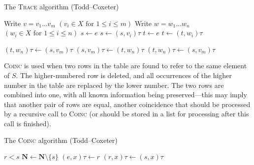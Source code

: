 \begin{algorithm}
\caption{The \textsc{Trace} algorithm (Todd--Coxeter)}
\label{alg:trace}
\begin{algorithmic}[1]
\State Write $v = v_1 \ldots v_m$ \Comment $(v_i \in X \text{~for~} 1 \leq i \leq m)$
\State Write $w = w_1 \ldots w_n$ \Comment $(w_i \in X \text{~for~} 1 \leq i \leq n)$
\State $s \gets e$
    \State {}
  \EndIf
  \State $s \gets (s, v_i)\tau$
\EndFor
\State $t \gets e$
    \State {}
  \EndIf
  \State $t \gets (t, w_i)\tau$
\EndFor

  \State {}
  \State $(t, w_n)\tau \gets (s, v_m)\tau$
  \State $(s, v_m)\tau \gets (t, w_n)\tau$
  \State $(t, w_n)\tau \gets (s, v_m)\tau$
  \State {}
\EndIf

\EndProcedure
\end{algorithmic}
\end{algorithm}

\textsc{Coinc} is used when two rows in the table are found to refer to the same
element of $S$.  The higher-numbered row is deleted, and all occurrences of the
higher number in the table are replaced by the lower number.  The two rows are
combined into one, with all known information being preserved---this may imply
that another pair of rows are equal, another coincidence that should be
processed by a recursive call to \textsc{Coinc} (or should be stored in a list
for processing after this call is finished).

\begin{algorithm}
\caption{The \textsc{Coinc} algorithm (Todd--Coxeter)}
\label{alg:coinc}
\begin{algorithmic}[1]
\Require $r < s$
\State $\mathbf{N} \gets \mathbf{N} \setminus \{s\}$
      \State $(e, x)\tau \gets r$
    \EndIf
  \EndFor
\EndFor
{}
    \State $(r, x)\tau \gets (s, x)\tau$
    \State {}
  \EndIf
\EndFor
\EndProcedure
\end{algorithmic}
\end{algorithm}

